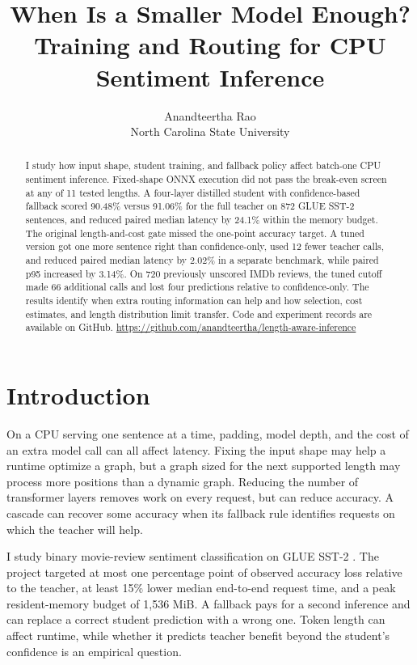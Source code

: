 \documentclass{article}
\title{When Is a Smaller Model Enough?\\Training and Routing for CPU Sentiment Inference}
\author{Anandteertha Rao\\North Carolina State University}
\begin{document}
\maketitle

\begin{abstract}
I study how input shape, student training, and fallback policy affect batch-one CPU sentiment inference. Fixed-shape ONNX execution did not pass the break-even screen at any of 11 tested lengths. A four-layer distilled student with confidence-based fallback scored 90.48\% versus 91.06\% for the full teacher on 872 GLUE SST-2 sentences, and reduced paired median latency by 24.1\% within the memory budget. The original length-and-cost gate missed the one-point accuracy target. A tuned version got one more sentence right than confidence-only, used 12 fewer teacher calls, and reduced paired median latency by 2.02\% in a separate benchmark, while paired p95 increased by 3.14\%. On 720 previously unscored IMDb reviews, the tuned cutoff made 66 additional calls and lost four predictions relative to confidence-only. The results identify when extra routing information can help and how selection, cost estimates, and length distribution limit transfer. Code and experiment records are available on GitHub.\newline
\url{https://github.com/anandteertha/length-aware-inference}
\end{abstract}

\section{Introduction}
On a CPU serving one sentence at a time, padding, model depth, and the cost of an extra model call can all affect latency. Fixing the input shape may help a runtime optimize a graph, but a graph sized for the next supported length may process more positions than a dynamic graph. Reducing the number of transformer layers removes work on every request, but can reduce accuracy. A cascade can recover some accuracy when its fallback rule identifies requests on which the teacher will help.

I study binary movie-review sentiment classification on GLUE SST-2 \citep{wang2018,socher2013}. The project targeted at most one percentage point of observed accuracy loss relative to the teacher, at least 15\% lower median end-to-end request time, and a peak resident-memory budget of 1,536 MiB. A fallback pays for a second inference and can replace a correct student prediction with a wrong one. Token length can affect runtime, while whether it predicts teacher benefit beyond the student's confidence is an empirical question.
\end{document}
